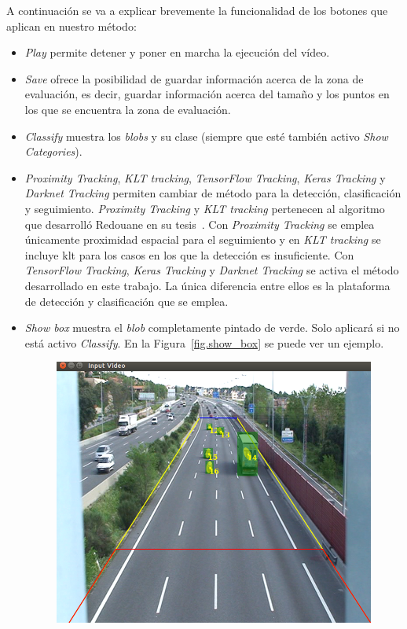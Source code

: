 A continuación se va a explicar brevemente la funcionalidad de los botones que aplican en nuestro método:
\begin{itemize}
    \item \textit{Play} permite detener y poner en marcha la ejecución del vídeo.
    \item \textit{Save} ofrece la posibilidad de guardar información acerca de la zona de evaluación, es decir, guardar información acerca del tamaño y los puntos en los que se encuentra la zona de evaluación.
    \item \textit{Classify} muestra los \textit{blobs} y su clase (siempre que esté también activo \textit{Show Categories}).
    \item \textit{Proximity Tracking}, \textit{KLT tracking}, \textit{TensorFlow Tracking}, \textit{Keras Tracking} y \textit{Darknet Tracking} permiten cambiar de método para la detección, clasificación y seguimiento. \textit{Proximity Tracking} y \textit{KLT tracking} pertenecen al algoritmo que desarrolló Redouane en su tesis~\cite{redo_tesis}. Con \textit{Proximity Tracking} se emplea únicamente proximidad espacial para el seguimiento y en \textit{KLT tracking} se incluye \acrshort{klt} para los casos en los que la detección es insuficiente. Con \textit{TensorFlow Tracking}, \textit{Keras Tracking} y \textit{Darknet Tracking} se activa el método desarrollado en este trabajo. La única diferencia entre ellos es la plataforma de detección y clasificación que se emplea.
    \item \textit{Show box} muestra el \textit{blob} completamente pintado de verde. Solo aplicará si no está activo \textit{Classify}. En la Figura~\ref{fig.show_box} se puede ver un ejemplo.
        \begin{figure}[H] 
    \begin{center}
    	\includegraphics[scale=0.35]{figures/Diseno_global/show_box.png}

\end{center}
\end{figure}
\end{itemize}
